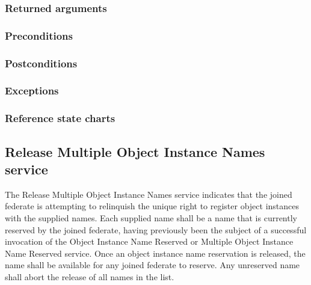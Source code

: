 \begin{compactstdpage}

    \subsubsection{Returned arguments}



    \subsubsection{Preconditions}



    \subsubsection{Postconditions}



    \subsubsection{Exceptions}



    \subsubsection{Reference state charts}



    \subsection{Release Multiple Object Instance Names service}


    The Release Multiple Object Instance Names service indicates that the joined federate is attempting to relinquish the unique right to register object instances with the supplied names. Each supplied name shall be a name that is currently reserved by the joined federate, having previously been the subject of a successful invocation of the Object Instance Name Reserved or Multiple Object Instance Name Reserved service. Once an object instance name reservation is released, the name shall be available for any joined federate to reserve. Any unreserved name shall abort the release of all names in the list.


\end{compactstdpage}
